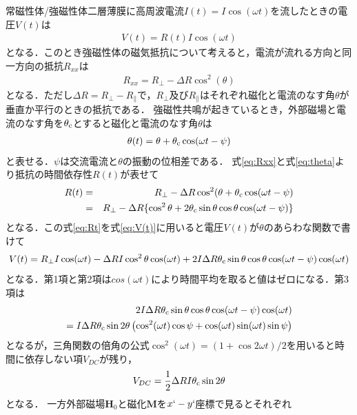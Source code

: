 常磁性体/強磁性体二層薄膜に高周波電流$I(t) = I\cos(\omega t)$を流したときの電圧$V(t)$は
\begin{eqnarray}
V(t) = R(t)I\cos(\omega t)
\label{eq:V(t)}
\end{eqnarray}
となる．このとき強磁性体の磁気抵抗について考えると，電流が流れる方向と同一方向の抵抗$R_{xx}$は
\begin{eqnarray}
R_{xx} = R_{\perp}-\Delta R\cos^{2}(\theta)
\label{eq:Rxx}
\end{eqnarray}
となる．ただし$\Delta R = R_{\perp}-R_{\parallel}$で，$R_{\perp}$及び$R_{\parallel}$はそれぞれ磁化と電流のなす角$\theta$が垂直か平行のときの抵抗である．
強磁性共鳴が起きているとき，外部磁場と電流のなす角を$\theta_{\rm c}$とすると磁化と電流のなす角$\theta$は
\begin{eqnarray}
\theta(t) = \theta + \theta_{\rm c}\cos(\omega t -\psi)
\label{eq:theta}
\end{eqnarray}
と表せる．$\psi$は交流電流と$\theta$の振動の位相差である．
式\ref{eq:Rxx}と式\ref{eq:theta}より抵抗の時間依存性$R(t)$が表せて
\begin{eqnarray}
R(t) &=&  R_{\perp} - \Delta R\cos^{2}(\theta + \theta_{\rm c}\cos(\omega t-\psi)\\\nonumber
&=& R_{\perp} - \Delta R\{\cos^{2}\theta + 2\theta_{\rm c}\sin\theta\cos\theta\cos(\omega t-\psi)\}
\label{eq:Rt}
\end{eqnarray}
となる．この式\ref{eq:Rt}を式\ref{eq:V(t)}に用いると電圧$V(t)$が$\theta$のあらわな関数で書けて
\begin{eqnarray}
V(t) = R_{\perp}I\cos(\omega t) - \Delta RI\cos^{2}\theta\cos(\omega t) + 2I\Delta R\theta_{\rm c}\sin\theta\cos\theta\cos(\omega t-\psi)\cos(\omega t)\nonumber
\label{eq:V(t)_2}
\end{eqnarray}
となる．第1項と第2項は$cos(\omega t)$により時間平均を取ると値はゼロになる．第3項は
\begin{eqnarray}
2I\Delta R\theta_{\rm c}\sin\theta\cos\theta\cos(\omega t-\psi)\cos(\omega t)\\
=I\Delta R\theta_{\rm c}\sin2\theta\left(\cos^{2}(\omega t)\cos\psi + \cos(\omega t)\sin(\omega t)\sin\psi\right)
\label{eq:V(t)_3}
\end{eqnarray}
となるが，三角関数の倍角の公式$\cos^{2}(\omega t)= (1+\cos2\omega t)/2$を用いると時間に依存しない項$V_{DC}$が残り，
\begin{eqnarray}
V_{DC} = \frac{1}{2}\Delta RI\theta_{\rm c}\sin2\theta
\label{eq:VDC}
\end{eqnarray}
となる．
一方外部磁場$\bm{H}_{0}$と磁化$\bm{M}$を$x`-y`$座標で見るとそれぞれ

